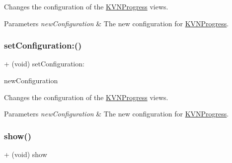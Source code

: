 Changes the configuration of the {\ttfamily \mbox{\hyperlink{interface_k_v_n_progress}{K\+V\+N\+Progress}}} views. 
\begin{DoxyParams}{Parameters}
{\em new\+Configuration} & The new configuration for {\ttfamily \mbox{\hyperlink{interface_k_v_n_progress}{K\+V\+N\+Progress}}}. \\
\hline
\end{DoxyParams}
\mbox{\label{interface_k_v_n_progress_ab00ed30bcc9ef7e6517f27554d570bf9}} 
\subsubsection{\texorpdfstring{set\+Configuration\+:()}{setConfiguration:()}\hspace{0.1cm}{\footnotesize\ttfamily [3/3]}}
{\footnotesize\ttfamily + (void) set\+Configuration\+: \begin{DoxyParamCaption}\item[{(\mbox{\hyperlink{interface_k_v_n_progress_configuration}{K\+V\+N\+Progress\+Configuration}} $\ast$)}]{new\+Configuration }\end{DoxyParamCaption}}

Changes the configuration of the {\ttfamily \mbox{\hyperlink{interface_k_v_n_progress}{K\+V\+N\+Progress}}} views. 
\begin{DoxyParams}{Parameters}
{\em new\+Configuration} & The new configuration for {\ttfamily \mbox{\hyperlink{interface_k_v_n_progress}{K\+V\+N\+Progress}}}. \\
\hline
\end{DoxyParams}
\mbox{\label{interface_k_v_n_progress_ad27933d0b2a65108404a514029689fb8}} 
\subsubsection{\texorpdfstring{show()}{show()}\hspace{0.1cm}{\footnotesize\ttfamily [1/3]}}
{\footnotesize\ttfamily + (void) show \begin{DoxyParamCaption}{ }\end{DoxyParamCaption}}

